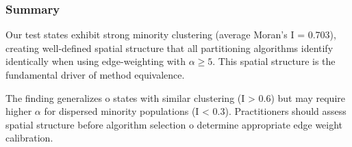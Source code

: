 \subsubsection{Summary}

Our test states exhibit strong minority clustering (average Moran's I = 0.703), creating well-defined spatial structure that all partitioning algorithms identify identically when using edge-weighting with $\alpha \geq 5$. This spatial structure is the fundamental driver of method equivalence.

The finding generalizes 	o states with similar clustering (I > 0.6) but may require higher $\alpha$ for dispersed minority populations (I < 0.3). Practitioners should assess spatial structure before algorithm selection 	o determine appropriate edge weight calibration.
